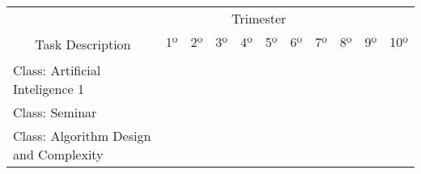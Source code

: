 \begin{table}[ht]
\begin{tabular}{lllllllllll}
\hline
\multicolumn{1}{c}{}                                  & \multicolumn{8}{c}{Trimester}                                                                                                                                                                                                             &                                              &                          \\ \cline{2-11} 
\multicolumn{1}{c}{\multirow{2}{*}{Task Description}} & 1º                       & 2º                       & 3º                       & 4º                       & 5º                       & 6º                       & 7º                       & 8º                                           & 9º                                           & 10º                      \\
\multicolumn{1}{c}{}                                  &                          &                          &                          &                          &                          &                          &                          &                                              &                                              &                          \\ \hline
Class: Artificial Inteligence 1                       & \cellcolor[HTML]{9AFF99} & \cellcolor[HTML]{9AFF99} &                          &                          &                          &                          &                          &                                              &                                              &                          \\ \hline
Class: Seminar                                        & \cellcolor[HTML]{9AFF99} & \cellcolor[HTML]{9AFF99} &                          &                          &                          &                          &                          &                                              &                                              &                          \\ \hline
Class: Algorithm Design and Complexity                &                          &                          & \cellcolor[HTML]{9AFF99} & \cellcolor[HTML]{9AFF99} &                          &                          &                          &                                              &                                              &                          \\ \hline

\end{tabular}
\end{table}
